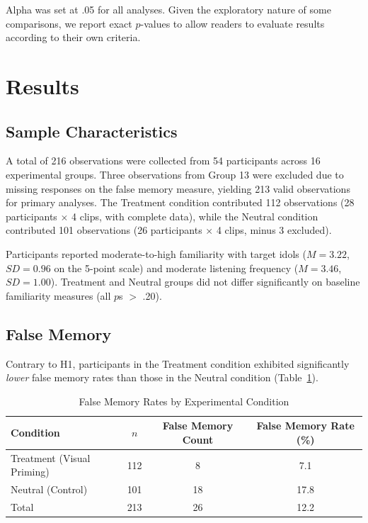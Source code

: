 \documentclass[12pt, a4paper]{article}
\begin{document}
Alpha was set at .05 for all analyses. Given the exploratory nature of some comparisons, we report exact $p$-values to allow readers to evaluate results according to their own criteria.


\section{Results}

\subsection{Sample Characteristics}

A total of 216 observations were collected from 54 participants across 16 experimental groups. Three observations from Group 13 were excluded due to missing responses on the false memory measure, yielding 213 valid observations for primary analyses. The Treatment condition contributed 112 observations (28 participants $\times$ 4 clips, with complete data), while the Neutral condition contributed 101 observations (26 participants $\times$ 4 clips, minus 3 excluded).

Participants reported moderate-to-high familiarity with target idols ($M = 3.22$, $SD = 0.96$ on the 5-point scale) and moderate listening frequency ($M = 3.46$, $SD = 1.00$). Treatment and Neutral groups did not differ significantly on baseline familiarity measures (all $p$s $>$ .20).

\subsection{False Memory}

Contrary to H1, participants in the Treatment condition exhibited significantly \textit{lower} false memory rates than those in the Neutral condition (Table~\ref{tab:false_memory}).

\begin{table}[H]
\centering
\caption{False Memory Rates by Experimental Condition}
\begin{tabular}{lccc}
\toprule
Condition & $n$ & False Memory Count & False Memory Rate (\%) \\
\midrule
Treatment (Visual Priming) & 112 & 8 & 7.1 \\
Neutral (Control) & 101 & 18 & 17.8 \\
\midrule
Total & 213 & 26 & 12.2 \\
\bottomrule
\end{tabular}
\label{tab:false_memory}
\end{table}
\end{document}
